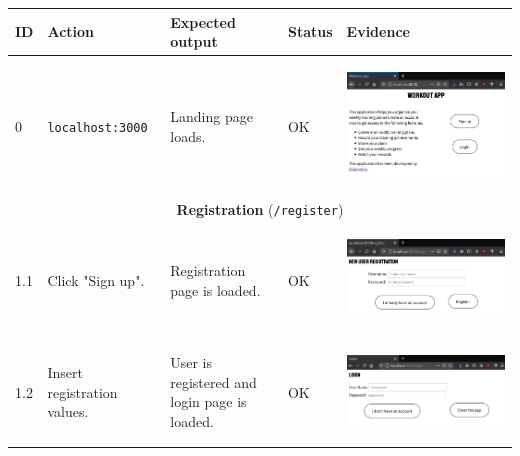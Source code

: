 \documentclass[12pt,twoside,titlepage,a4paper]{article}
\theoremstyle{definicion}
\theoremstyle{lema}
\theoremstyle{teorema}
\theoremstyle{corolario}
\theoremstyle{ejemplo}
\theoremstyle{nota}
\begin{document}
\begin{table}[!h]
	\centering
	\begin{tabular}{|m{0.6cm}|m{3cm}|m{3.6cm}|m{1.1cm}|m{5.9cm}|}
		\hline
		\textbf{ID} & \textbf{Action} & \textbf{Expected output} & \textbf{Status} & \textbf{Evidence} \\
		\hline
		0 & \texttt{localhost:3000} & Landing page loads. & OK &
		\begin{center}\includegraphics[scale=0.22]{landingpage.png}\end{center} \\
		\hline
		\multicolumn{5}{|c|}{\textbf{Registration} (\texttt{/register})} \\ 
		\hline 
		1.1 & Click "Sign up". & Registration page is loaded. & OK & 
		\begin{center}\includegraphics[scale=0.28]{register1.png}\end{center} \\
		\hline
		1.2 & Insert registration values. & User is registered and login page is loaded. & OK &
		\begin{center}\includegraphics[scale=0.28]{register2-login1.png}\end{center} \\

\end{tabular}
\end{table}
\end{document}
